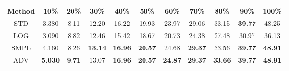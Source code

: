 \documentclass{standalone}
\begin{document}
\begin{tabular}{c|cccccccccc}
      \toprule
      Method & 10\% & 20\% & 30\% & 40\% & 50\% & 60\% & 70\% & 80\% & 90\% & 100\% \\
      \midrule
STD & 3.380 & 8.11 & 12.20 & 16.22 & 19.93 & 23.97 & 29.06 & 33.15 & \textbf{39.77} & 48.25\\
LOG & 3.090 & 8.82 & 12.46 & 15.42 & 18.67 & 20.73 & 24.38 & 27.48 & 30.97 & 36.13\\
SMPL & 4.160 & 8.26 & \textbf{13.14} & \textbf{16.96} & \textbf{20.57} & 24.68 & \textbf{29.37} & 33.56 & \textbf{39.77} & \textbf{48.91}\\
ADV & \textbf{5.030} & \textbf{9.71} & 13.07 & \textbf{16.96} & \textbf{20.57} & \textbf{24.87} & \textbf{29.37} & \textbf{33.66} & \textbf{39.77} & \textbf{48.91}\\
  \bottomrule
\end{tabular}
\end{document}
